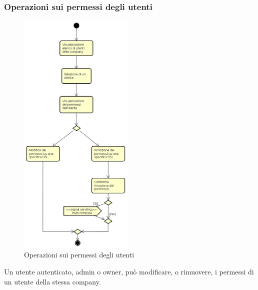 \subsubsection{Operazioni sui permessi degli utenti}
\begin{figure}[H]
\begin{center}
\includegraphics[height=12cm]{res/sections/backend/activities/operazioniSuUtenti.png}
\caption{Operazioni sui permessi degli utenti}
\end{center}
\end{figure}
Un utente autenticato, admin o owner, può modificare, o rimuovere, i permessi di un utente della stessa company.
